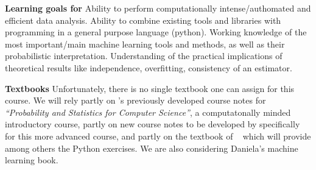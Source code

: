 \item[]{\bf Learning goals for \statcl} Ability to perform computationally intense/authomated and efficient data analysis. Ability to combine existing tools and libraries with programming in a general purpose language (python). 
Working knowledge of the most important/main machine learning tools and methods, as well as their probabilistic interpretation. Understanding of the practical implications of theoretical results like independence, overfitting, consistency of an estimator. 

{\bf Textbooks} Unfortunately, there is no single textbook one can
assign for this course. We will rely partly on \meila's previously
developed course notes for {\it ``Probability and Statistics for
  Computer Science''}, a computatonally minded introductory course,
partly on new course notes to be developed by \meila specifically for
this more advanced course, and partly on the textbook of \astrocl~
which will provide among others the Python exercises. We are also
considering \cite{} Daniela's machine learning book.


